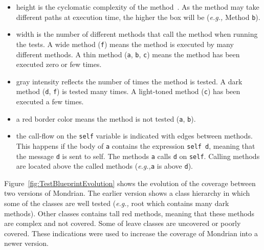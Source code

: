 \documentclass[runningheads]{llncs}
\newcommand{\ct}{\lstinline[backgroundcolor=\color{white},basicstyle=\footnotesize\ttfamily]}
\newcommand{\sd}[1]{\nb{SD}{orange}{#1}}
\newcommand{\eg}{\emph{e.g.,}\xspace}
\newcommand{\figref}[1]{Figure~\ref{fig:#1}}
\begin{document}
\begin{itemize}
\item height is the cyclomatic complexity of the method~\cite{McCa76a}. As the method may take different paths at execution time, the higher the box will be (\eg Method \ct{b}).
\item width is the number of different methods that call the method when running the tests. A wide method (\ct{f}) means the method is executed by many different methods. A thin method (\ct{a}, \ct{b}, \ct{c}) means the method has been executed zero or few times.
\item gray intensity reflects the number of times the method is tested. A dark method (\ct{d}, \ct{f}) is tested many times. A light-toned method (\ct{c}) has been executed a few times.
\item a red border color means the method is not tested (\ct{a}, \ct{b}). 
\item the call-flow on the \ct{self} variable is indicated with edges between methods. This happens if the body of \ct{a} contains the expression \ct{self d}, meaning that the message \ct{d} is sent to self. The methods \ct{a} calls \ct{d} on \ct{self}. %
Calling methods are located above the called methods (\eg \ct{a} is above \ct{d}).
\end{itemize}


\figref{TestBlueprintEvolution} shows the evolution of the coverage between two versions of Mondrian. The earlier version shows a class hierarchy in which some of the classes are well tested (\eg root which contains many dark methods). Other classes contains tall red methods, meaning that these methods are complex and not covered. Some of leave classes are uncovered or poorly covered. These indications were used to increase the coverage of Mondrian into a newer version.

\end{document}
